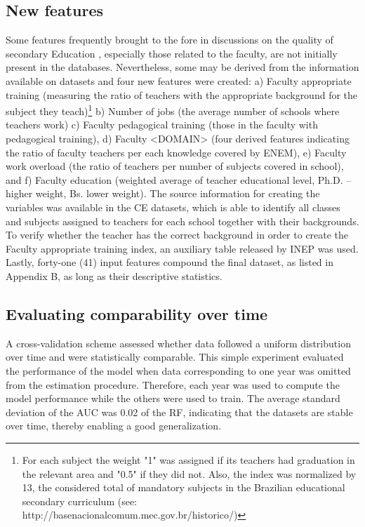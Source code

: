 \subsection{New features}
Some features frequently brought to the fore in discussions on the quality of secondary Education \cite{OCDE2013PISAPractices}, especially those related to the faculty, are not initially present in the databases. Nevertheless, some may be derived from the information available on datasets and four new features were created: a) Faculty appropriate training   (measuring the ratio of teachers with the appropriate background for the subject they teach)\footnote{For each subject the weight "1" was assigned if its teachers had graduation in the relevant area and "0.5" if they did not. Also, the index was normalized by 13, the considered total of mandatory subjects in the Brazilian educational secondary curriculum (see: http://basenacionalcomum.mec.gov.br/historico/)} b) Number of jobs (the average number of schools where teachers work) c) Faculty pedagogical training (those in the faculty with pedagogical training), d) Faculty <DOMAIN> (four derived features indicating the ratio of faculty teachers per each knowledge covered by ENEM), e) Faculty work overload (the ratio of teachers per number of subjects covered in school), and f) Faculty education (weighted average of teacher educational level, Ph.D. – higher weight, Bs. lower weight). The source information for creating the variables was available in the CE datasets, which is able to identify all classes and subjects assigned to teachers for each school together with their backgrounds. To verify whether the teacher has the correct background in order to create the Faculty appropriate training index, an auxiliary table released by INEP was used. Lastly, forty-one (41) input features compound the final dataset, as listed in Appendix B, as long as their descriptive statistics.

\subsection{Evaluating comparability over time}

A cross-validation scheme assessed whether data followed a uniform distribution over time and were statistically comparable. This simple experiment evaluated the performance of the model when data corresponding to one year was omitted from the estimation procedure. Therefore, each year was used to compute the model performance while the others were used to train. The average standard deviation of the AUC was 0.02 of the RF, indicating that the datasets are stable over time, thereby enabling a good generalization.  

